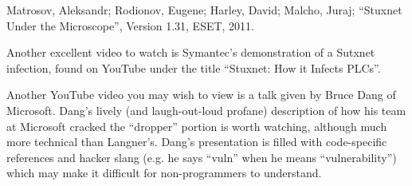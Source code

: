 \vskip 10pt

\noindent
Matrosov, Aleksandr; Rodionov, Eugene; Harley, David; Malcho, Juraj; ``Stuxnet Under the Microscope'', Version 1.31, ESET, 2011.

\vskip 10pt

Another excellent video to watch is Symantec's demonstration of a Sutxnet infection, found on YouTube under the title ``Stuxnet: How it Infects PLCs''.

Another YouTube video you may wish to view is a talk given by Bruce Dang of Microsoft.  Dang's lively (and laugh-out-loud profane) description of how his team at Microsoft cracked the ``dropper'' portion is worth watching, although much more technical than Langner's.  Dang's presentation is filled with code-specific references and hacker slang (e.g. he says ``vuln'' when he means ``vulnerability'') which may make it difficult for non-programmers to understand.










